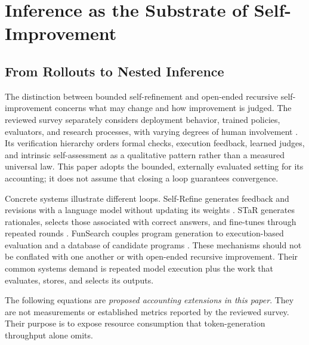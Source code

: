 \documentclass[journal]{IEEEtran}
\begin{document}
\section{Inference as the Substrate of Self-Improvement}
\label{sec:self-improvement}
\subsection{From Rollouts to Nested Inference}
The distinction between bounded self-refinement and open-ended recursive self-improvement concerns what may change and how improvement is judged. The reviewed survey separately considers deployment behavior, trained policies, evaluators, and research processes, with varying degrees of human involvement \cite{chen2026rsi}. Its verification hierarchy orders formal checks, execution feedback, learned judges, and intrinsic self-assessment as a qualitative pattern rather than a measured universal law. This paper adopts the bounded, externally evaluated setting for its accounting; it does not assume that closing a loop guarantees convergence.

Concrete systems illustrate different loops. Self-Refine generates feedback and revisions with a language model without updating its weights \cite{madaan2023selfrefine}. STaR generates rationales, selects those associated with correct answers, and fine-tunes through repeated rounds \cite{zelikman2022star}. FunSearch couples program generation to execution-based evaluation and a database of candidate programs \cite{romeraparedes2024funsearch}. These mechanisms should not be conflated with one another or with open-ended recursive improvement. Their common systems demand is repeated model execution plus the work that evaluates, stores, and selects its outputs.

The following equations are \emph{proposed accounting extensions in this paper}. They are not measurements or established metrics reported by the reviewed survey. Their purpose is to expose resource consumption that token-generation throughput alone omits.
\end{document}
